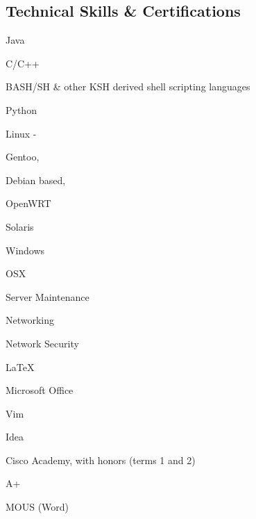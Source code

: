 \documentclass[a4paper,margin,line]{resume}
\begin{document}
\begin{resume}
\section{\mysidestyle Technical Skills \& Certifications}
	\begin{compactdesc}
		\item[Languages] \begin{inparaenum} { \small
			\item Java
			\item C/C++
			\item BASH/SH \& other KSH derived shell scripting languages
			\item Python
		} \end{inparaenum}
		\item[Operating Systems] \begin{inparaenum} { \small
			\item Linux -
			\begin{inparablank}
				\item Gentoo,
				\item Debian based,
				\item OpenWRT
			\end{inparablank}
			\item Solaris
			\item Windows
			\item OSX
		} \end{inparaenum}
		\item[Hardware] \begin{inparaenum} { \small
			\item Server Maintenance
			\item Networking
			\item Network Security
		} \end{inparaenum}
		\item[Tools] \begin{inparaenum} { \small
			\item \LaTeX
			\item Microsoft Office
			\item Vim
			\item Idea
		} \end{inparaenum}
		\item[Certifications] \begin{inparaenum} { \small
			\item Cisco Academy, with honors (terms 1 and 2)
			\item A+
			\item MOUS (Word)
		} \end{inparaenum}
	\end{compactdesc}


\end{resume}
\end{document}

